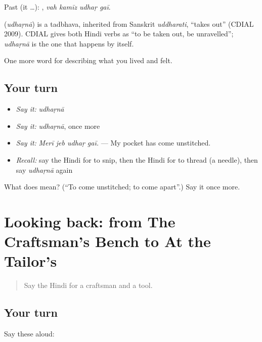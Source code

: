 Past (it …):    , \emph{vah kamīz udhaṛ gaī}.

\begin{cousinweb}
\textbf{} (\emph{udhaṛnā}) is a tadbhava, inherited from Sanskrit \emph{uddharati}, \textquotedblleft{}takes out\textquotedblright{} (CDIAL 2009). CDIAL gives both Hindi verbs as \textquotedblleft{}to be taken out, be unravelled\textquotedblright{}; \emph{udhaṛnā} is the one that happens by itself.
\end{cousinweb}

\begin{grammarlens}[title={What you've built}]
One more word for describing what you lived and felt.
\end{grammarlens}

\subsection*{Your turn}
\begin{itemize}
\raggedright
  \item \emph{Say it:} \emph{udhaṛnā}
  \item \emph{Say it:} \emph{udhaṛnā}, once more
  \item \emph{Say it:} \emph{Merī jeb udhaṛ gaī.} — My pocket has come unstitched.
  \item \emph{Recall:} say the Hindi for to snip, then the Hindi for to thread (a needle), then say \emph{udhaṛnā} again
\end{itemize}

\begin{tcolorbox}[breakable,colback=teal!4,colframe=teal!35!black,title={Before you move on}]
What does  mean? (\textquotedblleft{}To come unstitched; to come apart\textquotedblright{}.) Say it once more.
\end{tcolorbox}
\section[(dialogue)]{Looking back: from The Craftsman's Bench to At the Tailor's}

\label{lesson:HI-R513-review-506-513}



\begin{quote}
Say the Hindi for a craftsman and a tool.
\end{quote}

\subsection*{Your turn}
Say these aloud:

